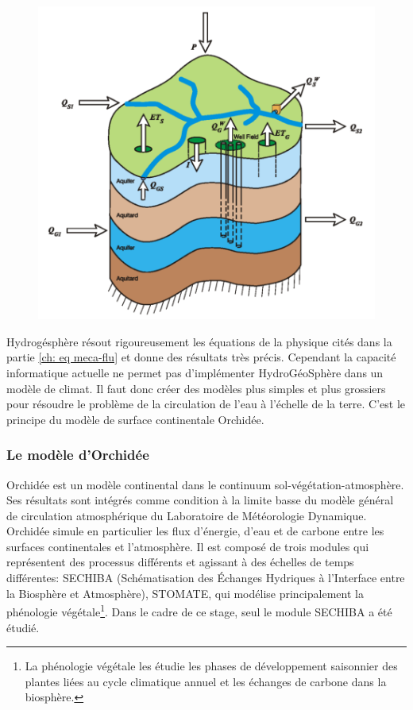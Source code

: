 \documentclass[a4paper,11pt]{article}
\numberwithin{equation}{section}
\begin{document}
\begin{figure}[H]
	\begin{center}
		\includegraphics[scale=0.35]{HGS_modele.png}
	\end{center}
	\label{fig-HGS_water_balance}
\end{figure}

Hydrogésphère résout rigoureusement les équations de la physique cités dans la partie \ref{ch: eq meca-flu} et donne des résultats très précis. Cependant la capacité informatique actuelle ne permet pas d'implémenter HydroGéoSphère dans un modèle de climat. Il faut donc créer des modèles plus simples et plus grossiers pour résoudre le problème de la circulation de l'eau à l'échelle de la terre. C'est le principe du modèle de surface continentale Orchidée.

\subsubsection{Le modèle d'Orchidée}

Orchidée est un modèle continental dans le continuum sol-végétation-atmosphère. Ses résultats sont intégrés comme condition à la limite basse du modèle général de circulation atmosphérique du Laboratoire de Météorologie Dynamique. Orchidée simule en particulier les flux d’énergie, d’eau et de carbone entre les surfaces continentales et l’atmosphère. Il est composé de trois modules qui représentent des processus différents et agissant à des échelles de temps différentes: SECHIBA (Schématisation des Échanges Hydriques à l’Interface entre la Biosphère et Atmosphère), STOMATE, qui modélise principalement la phénologie végétale\footnote{La phénologie végétale les étudie les phases de développement saisonnier des plantes liées au cycle climatique annuel et les échanges de carbone dans la biosphère.}. Dans le cadre de ce stage, seul le module SECHIBA a été étudié.
\end{document}
